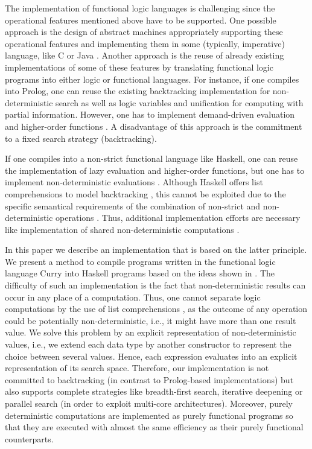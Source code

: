 \documentclass{llncs}
\begin{document}
The implementation of functional logic languages is challenging
since the operational features mentioned above have to be supported.
One possible approach
is the design of abstract machines appropriately supporting
these operational features and implementing them in some (typically,
imperative) language, like C \cite{Lux99FLOPS}
or Java \cite{AntoyHanusLiuTolmach05,HanusSadre99JFLP}.
Another approach is the reuse of already existing implementations
of some of these features by translating
functional logic programs into either logic or functional languages.
For instance, if one compiles into Prolog, one can reuse
the existing backtracking implementation for non-deterministic
search as well as logic variables and unification for computing with partial
information. However, one has to implement demand-driven evaluation
and higher-order functions \cite{AntoyHanus00FROCOS}.
A disadvantage of this approach is the commitment to a fixed
search strategy (backtracking).

If one compiles into a non-strict functional language like Haskell,
one can reuse the implementation
of lazy evaluation and higher-order functions, but one has
to implement non-deterministic evaluations
\cite{BrasselFischerHanusReck11,BrasselHuch07}.
Although Haskell offers list comprehensions to model
backtracking \cite{Wadler85}, this cannot be exploited
due to the specific semantical requirements of the combination
of non-strict and non-deterministic operations
\cite{GonzalezEtAl99}. Thus, additional implementation efforts
are necessary like implementation of shared
non-deterministic computations \cite{FischerKiselyovShan09}.

In this paper we describe an implementation that is based
on the latter principle. We present a method to compile
programs written in the functional logic language Curry \cite{Hanus06Curry}
into Haskell programs based on the ideas shown
in \cite{BrasselFischer08IFL}.
The difficulty of such an implementation is the fact
that non-deterministic results can occur in any place of a
computation. Thus, one cannot separate logic computations
by the use of list comprehensions \cite{Wadler85},
as the outcome of any operation could be potentially non-deterministic,
i.e., it might have more than one result value.
We solve this problem by an explicit representation of
non-deterministic values, i.e., we extend each data type by
another constructor to represent the choice between several values.
Hence, each expression evaluates into an explicit representation
of its search space. Therefore, our implementation is not
committed to backtracking (in contrast to Prolog-based implementations)
but also supports complete strategies like breadth-first search,
iterative deepening or parallel search (in order to exploit
multi-core architectures).
Moreover, purely deterministic computations
are implemented as purely functional programs so that
they are executed with almost the same efficiency
as their purely functional counterparts.
\end{document}
